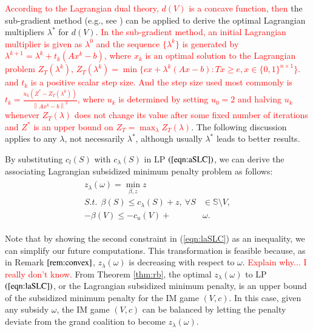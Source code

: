 \documentclass[authoryear,review,12pt]{elsarticle}
\begin{document}
\textcolor{red}{According to the Lagrangian dual theory, $d(V)$ is a concave function, then}
the sub-gradient method (e.g., see \citealt{fisher1981lagrangian}) can be applied to derive the optimal Lagrangian multipliers $\lambda^*$ for $d(V)$.
\textcolor{red}{In the sub-gradient method, an initial Lagrangian multiplier is given as $\lambda^0$ and the sequence $\{\lambda^k\}$ is generated by $\lambda^{k+1}= \lambda^k + t_k (Ax^k - b)$, where $x_k$ is an optimal solution to the Lagrangian problem $Z_T(\lambda^k)$, $Z_T(\lambda^k) = \min \big\{ cx + \lambda^k (Ax - b): Tx \geq e, x \in \{0,1\}^{n \times 1} \big\}.
$ and $t_k$ is a positive scalar step size. And the step size used most commonly is
$t_{k}=\frac{u_{k}\left(Z^{*}-Z_{T}\left(\lambda^{k}\right)\right)}{\left\|A x^{k}-b\right\|^{2}}$, where $u_k$ is determined by setting $u_0 = 2$ and halving $u_k$ whenever $Z_{T}(\lambda)$ does not change its value after some fixed number of iterations and $Z^{*}$ is an upper bound on $Z_{T}=\max_{\lambda} Z_{T}(\lambda)$}.
The following discussion applies to any $\lambda$, not necessarily $\lambda^*$, although usually $\lambda^*$ leads to better results.

By substituting $c_l(S)$ with $c_{\lambda}(S)$ in LP $(\ref{eqn:aSLC})$, we can derive the associating Lagrangian subsidized minimum penalty problem as follows:
\begin{eqnarray}\label{eqn:laSLC}
\begin{aligned}
z_{\lambda}(\omega) = \min_{\beta,z} z~~&\\
S.t.~~ \beta(S) \leq  c_{\lambda}(S) + z,~ \forall S &\in \mathbb{S} \setminus V,\\
-\beta(V) \leq -  c_u(V)+&\omega.
\end{aligned}
\end{eqnarray}

Note that by showing the second constraint in (\ref{eqn:laSLC}) as an inequality, we can simplify our future computations. This transformation is feasible because, as in Remark $\ref{rem:convex}$, $z_{\lambda}(\omega)$ is decreasing with respect to $\omega$.
\textcolor{red}{Explain why... I really don't know.}
From Theorem \ref{thm:rb}, %
the optimal $z_{\lambda}(\omega)$ to LP $(\ref{eqn:laSLC})$, or the Lagrangian subsidized minimum penalty, is an upper bound of the subsidized minimum penalty for the IM game $(V,c)$.
In this case, given any subsidy $\omega$, the IM game $(V,c)$ can be balanced by letting the penalty deviate from the grand coalition to become $z_{\lambda}(\omega)$. %
\end{document}
